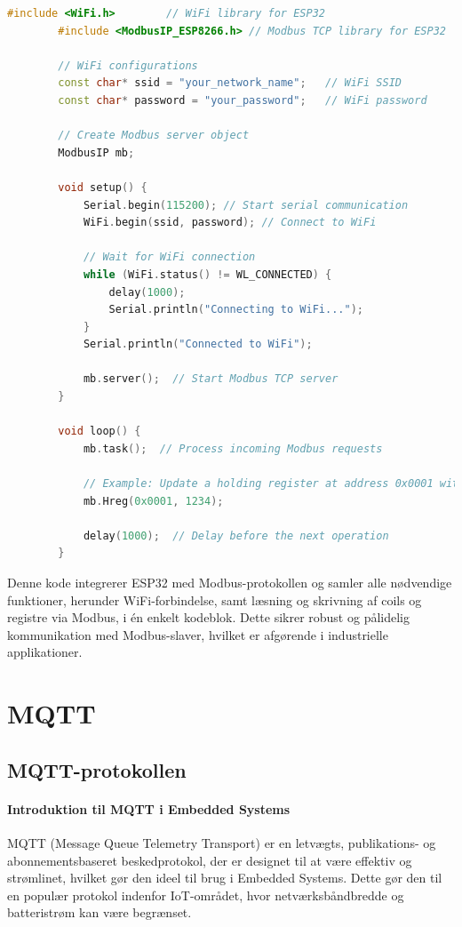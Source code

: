 \documentclass[12pt,a4paper]{book}
\begin{document}
	\begin{lstlisting}[language=C++, caption=Integration af ESP32 med Modbus]
		#include <WiFi.h>        // WiFi library for ESP32
		#include <ModbusIP_ESP8266.h> // Modbus TCP library for ESP32
		
		// WiFi configurations
		const char* ssid = "your_network_name";   // WiFi SSID
		const char* password = "your_password";   // WiFi password
		
		// Create Modbus server object
		ModbusIP mb;
		
		void setup() {
			Serial.begin(115200); // Start serial communication
			WiFi.begin(ssid, password); // Connect to WiFi
			
			// Wait for WiFi connection
			while (WiFi.status() != WL_CONNECTED) {
				delay(1000); 
				Serial.println("Connecting to WiFi...");
			}
			Serial.println("Connected to WiFi");
			
			mb.server();  // Start Modbus TCP server
		}
		
		void loop() {
			mb.task();  // Process incoming Modbus requests
			
			// Example: Update a holding register at address 0x0001 with the value 1234
			mb.Hreg(0x0001, 1234);
			
			delay(1000);  // Delay before the next operation
		}
	\end{lstlisting}
	Denne kode integrerer ESP32 med Modbus-protokollen og samler alle nødvendige funktioner, herunder WiFi-forbindelse, samt læsning og skrivning af coils og registre via Modbus, i én enkelt kodeblok. Dette sikrer robust og pålidelig kommunikation med Modbus-slaver, hvilket er afgørende i industrielle applikationer.	
	
	\chapter{MQTT}
	\section{MQTT-protokollen}
	\subsubsection*{Introduktion til MQTT i Embedded Systems}
	MQTT (Message Queue Telemetry Transport) er en letvægts, publikations- og abonnementsbaseret beskedprotokol, der er designet til at være effektiv og strømlinet, hvilket gør den ideel til brug i Embedded Systems. Dette gør den til en populær protokol indenfor IoT-området, hvor netværksbåndbredde og batteristrøm kan være begrænset.
	
\end{document}
